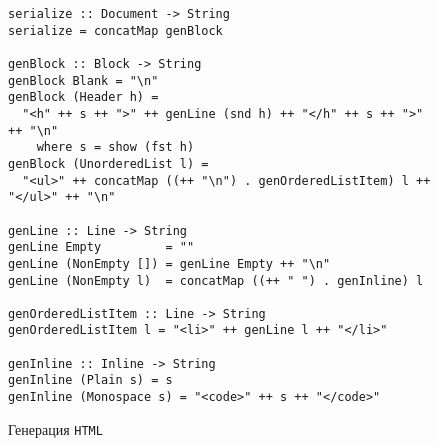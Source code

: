\begin{figure}[h]
\begin{lstlisting}
serialize :: Document -> String
serialize = concatMap genBlock

genBlock :: Block -> String
genBlock Blank = "\n"
genBlock (Header h) =
  "<h" ++ s ++ ">" ++ genLine (snd h) ++ "</h" ++ s ++ ">" ++ "\n"
    where s = show (fst h)
genBlock (UnorderedList l) =
  "<ul>" ++ concatMap ((++ "\n") . genOrderedListItem) l ++ "</ul>" ++ "\n"

genLine :: Line -> String
genLine Empty         = ""
genLine (NonEmpty []) = genLine Empty ++ "\n"
genLine (NonEmpty l)  = concatMap ((++ " ") . genInline) l

genOrderedListItem :: Line -> String
genOrderedListItem l = "<li>" ++ genLine l ++ "</li>"

genInline :: Inline -> String
genInline (Plain s) = s
genInline (Monospace s) = "<code>" ++ s ++ "</code>"
\end{lstlisting}
\caption{Генерация \lstinline{HTML}}
\label{listing:HTMLGen}
\end{figure}

\printbibliography[heading=bibintoc%
]


